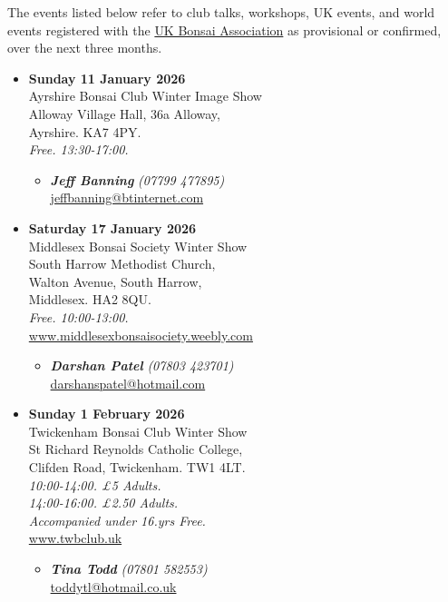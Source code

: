 \label{2025-12-events}

The events listed below refer to club talks, workshops, UK events, and world events registered with the \href{https://www.ukbonsaiassoc.org/events.html}{UK Bonsai Association} as provisional or confirmed, over the next three months.
\begin{itemize}

    \item \textbf{Sunday 11 January 2026}
    \\
    Ayrshire Bonsai Club Winter Image Show \\
    Alloway Village Hall, 36a Alloway, \\
    Ayrshire. KA7 4PY.
    \\
    \emph{Free. 13:30-17:00.}
    \begin{itemize}
        \item \textbf{\emph{Jeff Banning}} \emph{(07799 477895)} \\
        \href{mailto:jeffbanning@btinternet.com}{jeffbanning@btinternet.com} 
    \end{itemize}

    \item \textbf{Saturday 17 January 2026}
    \\
    Middlesex Bonsai Society Winter Show \\
    South Harrow Methodist Church, \\
    Walton Avenue, South Harrow, \\
    Middlesex. HA2 8QU.
    \\
    \emph{Free. 10:00-13:00.}
    \\
    \href{https://www.middlesexbonsaisociety.weebly.com}{www.middlesexbonsaisociety.weebly.com}
    \begin{itemize}
        \item \textbf{\emph{Darshan Patel}} \emph{(07803 423701)} \\
        \href{mailto:darshanspatel@hotmail.com}{darshanspatel@hotmail.com} 
    \end{itemize}

    \item \textbf{Sunday 1 February 2026}
    \\
    Twickenham Bonsai Club Winter Show \\
    St Richard Reynolds Catholic College, \\
    Clifden Road, Twickenham. TW1 4LT.
    \\
    \emph{10:00-14:00. £5 Adults.} \\
    \emph{14:00-16:00. £2.50 Adults.} \\
    \emph{Accompanied under 16.yrs Free.}
    \\
    \href{https://www.twbclub.uk}{www.twbclub.uk}
    \begin{itemize}
        \item \textbf{\emph{Tina Todd}} \emph{(07801 582553)} \\
        \href{mailto:toddytl@hotmail.co.uk}{toddytl@hotmail.co.uk} 
    \end{itemize}


\end{itemize}
